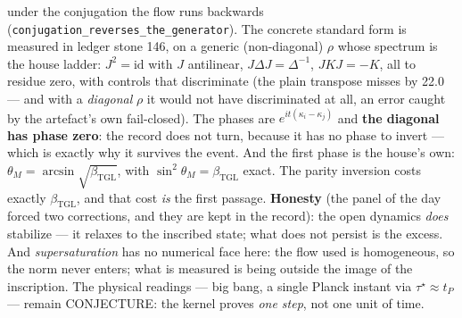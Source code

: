\documentclass[11pt]{article}
\newcommand{\bTGL}{\beta_{\mathrm{TGL}}}\newcommand{\Msun}{M_{\odot}}\newcommand{\TGL}{\mathrm{TGL}}
\theoremstyle{definition}\newtheorem{deriv}{Derivation}
\begin{document}
under the conjugation the flow runs backwards (\texttt{conjugation\_reverses\_the\_generator}). The concrete standard form is measured in ledger stone 146, on a generic (non-diagonal) $\rho$ whose spectrum is the house ladder: $J^2=\mathrm{id}$ with $J$ antilinear, $J\Delta J=\Delta^{-1}$, $JKJ=-K$, all to residue zero, with controls that discriminate (the plain transpose misses by 22.0 --- and with a \emph{diagonal} $\rho$ it would not have discriminated at all, an error caught by the artefact's own fail-closed). The phases are $e^{it(\kappa_i-\kappa_j)}$ and \textbf{the diagonal has phase zero}: the record does not turn, because it has no phase to invert --- which is exactly why it survives the event. And the first phase is the house's own: $\theta_M=\arcsin\sqrt{\bTGL}$, with $\sin^2\theta_M=\bTGL$ exact. The parity inversion costs exactly $\bTGL$, and that cost \emph{is} the first passage. \textbf{Honesty} (the panel of the day forced two corrections, and they are kept in the record): the open dynamics \emph{does} stabilize --- it relaxes to the inscribed state; what does not persist is the excess. And \emph{supersaturation} has no numerical face here: the flow used is homogeneous, so the norm never enters; what is measured is being outside the image of the inscription. The physical readings --- big bang, a single Planck instant via $\tau^\star\approx t_P$ --- remain \textsf{CONJECTURE}: the kernel proves \emph{one step}, not one unit of time.
\end{document}
